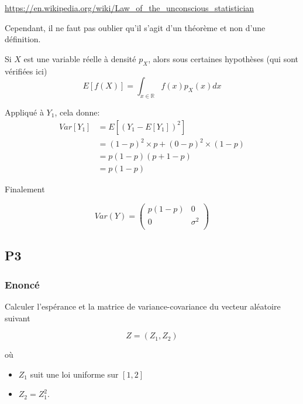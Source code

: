\documentclass[
10pt, %
a4paper, %
oneside, %
headinclude,footinclude, %
BCOR5mm, %
]{scrartcl}
\begin{document}
\url{https://en.wikipedia.org/wiki/Law_of_the_unconscious_statistician} 

Cependant, il ne faut pas oublier qu'il s'agit d'un théorème et non d'une définition.

Si $X$ est une variable réelle à densité $p_X$, alors sous certaines hypothèses (qui sont vérifiées ici)
\begin{equation}
    E[f(X)] = \int_{x\in \mathbb{R} } f(x) p_X(x) dx 
\end{equation}

Appliqué à $Y_1$, cela donne:
\begin{equation}
    \begin{aligned}
        \label{eq:}
        Var[Y_1] &= E[(Y_1-E[Y_1])^2]\\
        &= (1-p)^2\times p + (0-p)^2\times (1-p)\\
        &= p(1-p)(p+1-p)\\
        &= p(1-p)
    \end{aligned}
\end{equation}

Finalement

\begin{equation*}
    Var(Y) = 
\begin{pmatrix}
    p(1-p)  & 0 \\
    0  & \sigma^2 \\
\end{pmatrix}
\end{equation*}


\subsection{\color{MidnightBlue}P3}

\subsubsection{Enoncé}
\label{par:enoncé}

Calculer l'espérance et la matrice de variance-covariance du vecteur aléatoire suivant

\begin{equation}
    Z = (Z_1, Z_2)
\end{equation}

où
\begin{itemize}
    \item $Z_1$ suit une loi uniforme sur $[1, 2]$
    \item $Z_2=Z_1^2$.
\end{itemize}
\end{document}
